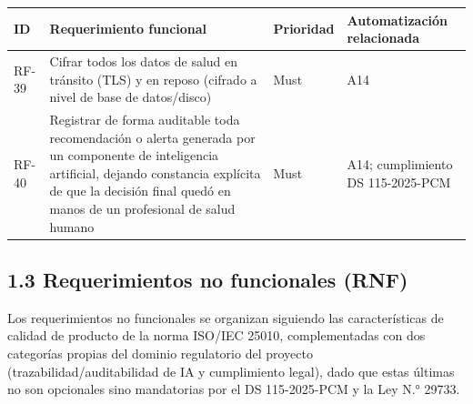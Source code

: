 \documentclass[11pt,a4paper]{article}
\begin{document}
{\small
\begin{longtable}[]{@{}
  >{\raggedright\arraybackslash}p{}
  >{\raggedright\arraybackslash}p{}
  >{\raggedright\arraybackslash}p{}
  >{\raggedright\arraybackslash}p{}@{}}
\toprule\noalign{}
\begin{minipage}[b]{\linewidth}\raggedright
ID
\end{minipage} & \begin{minipage}[b]{\linewidth}\raggedright
Requerimiento funcional
\end{minipage} & \begin{minipage}[b]{\linewidth}\raggedright
Prioridad
\end{minipage} & \begin{minipage}[b]{\linewidth}\raggedright
Automatización relacionada
\end{minipage} \\
\midrule\noalign{}
\endhead
\bottomrule\noalign{}
\endlastfoot
RF-39 & Cifrar todos los datos de salud en tránsito (TLS) y en reposo (cifrado a nivel de base de datos/disco) & Must & A14 \\
RF-40 & Registrar de forma auditable toda recomendación o alerta generada por un componente de inteligencia artificial, dejando constancia explícita de que la decisión final quedó en manos de un profesional de salud humano & Must & A14; cumplimiento DS 115-2025-PCM \\
\end{longtable}
}

\subsection{1.3 Requerimientos no funcionales (RNF)}\label{requerimientos-no-funcionales-rnf}

Los requerimientos no funcionales se organizan siguiendo las características de calidad de producto de la norma ISO/IEC 25010, complementadas con dos categorías propias del dominio regulatorio del proyecto (trazabilidad/auditabilidad de IA y cumplimiento legal), dado que estas últimas no son opcionales sino mandatorias por el DS 115-2025-PCM y la Ley N.° 29733.
\end{document}
